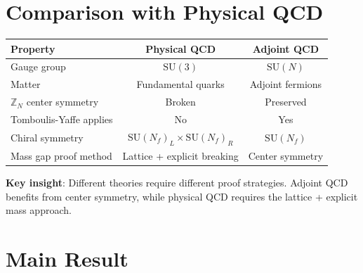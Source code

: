\documentclass[12pt,a4paper]{article}
\theoremstyle{remark}
\newcommand{\SU}{\mathrm{SU}}
\newcommand{\Z}{\mathbb{Z}}
\begin{document}
\section{Comparison with Physical QCD}

\begin{center}
\begin{tabular}{|l|c|c|}
\hline
\textbf{Property} & \textbf{Physical QCD} & \textbf{Adjoint QCD} \\
\hline
Gauge group & $\SU(3)$ & $\SU(N)$ \\
Matter & Fundamental quarks & Adjoint fermions \\
$\Z_N$ center symmetry & Broken & Preserved \\
Tomboulis-Yaffe applies & No & Yes \\
Chiral symmetry & $\SU(N_f)_L \times \SU(N_f)_R$ & $\SU(N_f)$ \\
Mass gap proof method & Lattice + explicit breaking & Center symmetry \\
\hline
\end{tabular}
\end{center}

\textbf{Key insight}: Different theories require different proof strategies. 
Adjoint QCD benefits from center symmetry, while physical QCD requires the 
lattice + explicit mass approach.

\section{Main Result}
\end{document}
